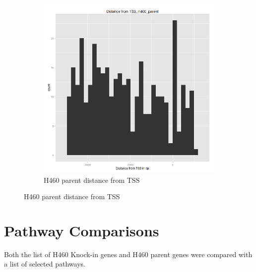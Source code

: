 \documentclass[11pt]{article}
\begin{document}
\begin{figure}[H]
\begin{subfigure}{.4\textwidth}
  \includegraphics[scale=0.3]{distribution_parent.png}
  \caption{H460 parent distance from TSS}
  \label{fig:sub2}
\end{subfigure}

\label{fig:test}
\end{figure}



\newpage


\section*{Pathway Comparisons}

Both the list of H460 Knock-in genes and H460 parent genes were compared with a list of selected pathways.
\end{document}
